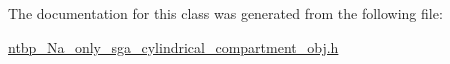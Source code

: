 The documentation for this class was generated from the following file:\begin{DoxyCompactItemize}
\item 
\hyperlink{ntbp___na__only__sga__cylindrical__compartment__obj_8h}{ntbp\_\-Na\_\-only\_\-sga\_\-cylindrical\_\-compartment\_\-obj.h}\end{DoxyCompactItemize}
